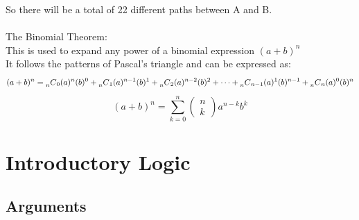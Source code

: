 \documentclass[11pt, fleqn]{article}
\begin{document}
So there will be a total of 22 different paths between A and B.\\
\\
The Binomial Theorem:\\
This is used to expand any power of a binomial expression $(a+b)^n$\\
It follows the patterns of Pascal's triangle and can be expressed as:
$$(a+b)^n=\prescript{}{n}{C}_{0}(a)^n(b)^0+\prescript{}{n}{C}_{1}(a)^{n-1}(b)^1+\prescript{}{n}{C}_{2}(a)^{n-2}(b)^2+\cdots+\prescript{}{n}{C}_{n-1}(a)^1(b)^{n-1}+\prescript{}{n}{C}_{n}(a)^0(b)^n$$
$$(a+b)^n=\sum_{k=0}^n\left(\begin{matrix}n\\k\end{matrix}\right)a^{n-k}b^k$$


































\section{Introductory Logic}
\subsection{Arguments}
\end{document}
